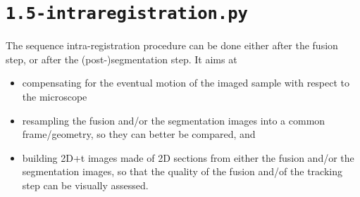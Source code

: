 \section{\texttt{1.5-intraregistration.py}}
\label{sec:cli:intraregistration}

The sequence intra-registration procedure can be done either after the fusion step, or after the (post-)segmentation step. It aims at
\begin{itemize}
\itemsep -1ex
\item compensating for the eventual motion of the imaged sample with respect to the microscope
\item resampling the fusion and/or the segmentation images into a common frame/geometry, so they can better be compared, and
\item building 2D+t images made of 2D sections from either the  fusion
  and/or the segmentation images, so that the quality of the fusion
  and/of the tracking step can be visually assessed. 
\end{itemize}



